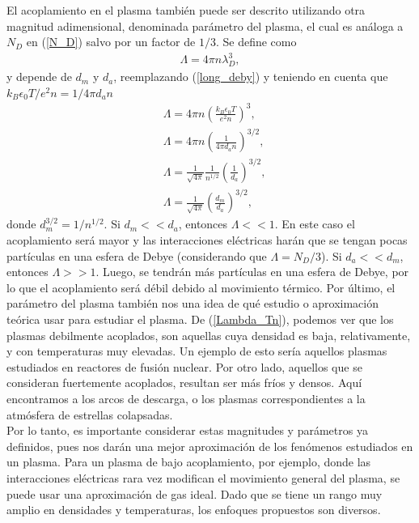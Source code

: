 \documentclass[../main.tex]{subfiles}
\begin{document}
El acoplamiento en el plasma también puede ser descrito utilizando otra magnitud adimensional, denominada parámetro del plasma, el cual es análoga a $N_D$ en (\ref{N_D}) salvo por un factor de $1/3$. Se define como
\begin{align}
    \Lambda = 4\pi n\lambda_D^3,
\end{align}
y depende de $d_m$ y $d_a$, reemplazando (\ref{long_deby}) y teniendo en cuenta que $k_B\epsilon_0T/e^2n =1/4\pi d_an$
\begin{align}
    &\Lambda = 4\pi n\left(\frac{k_B\epsilon_0T}{e^2n}\right)^3, \label{Lambda_Tn} \\
    &\Lambda = 4\pi n\left(\frac{1}{4\pi d_an}\right)^{3/2}, \\
    &\Lambda = \frac{1}{\sqrt{4\pi}}\frac{1}{n^{1/2}}\left(\frac{1}{d_a}\right)^{3/2}, \\
    &\Lambda = \frac{1}{\sqrt{4\pi}}\left(\frac{d_m}{d_a}\right)^{3/2},
\end{align}
donde $d_m^{3/2}= 1/n^{1/2}$. Si $d_m << d_a $, entonces $\Lambda << 1$. En este caso el acoplamiento será mayor y las interacciones eléctricas harán que se tengan pocas partículas en una esfera de Debye (considerando que $\Lambda = N_D/3$). Si $d_a << d_m$, entonces $\Lambda >> 1$. Luego, se tendrán más partículas en una esfera de Debye, por lo que el acoplamiento será débil debido al movimiento térmico. Por último, el parámetro del plasma también nos una idea de qué estudio o aproximación teórica usar para estudiar el plasma. De (\ref{Lambda_Tn}), podemos ver que los plasmas debilmente acoplados, son aquellas cuya densidad es baja, relativamente, y con temperaturas muy elevadas. Un ejemplo de esto sería aquellos plasmas estudiados en reactores de fusión nuclear. Por otro lado, aquellos que se consideran fuertemente acoplados, resultan ser más fríos y densos. Aquí encontramos a los arcos de descarga, o los plasmas correspondientes a la atmósfera de estrellas colapsadas. \\

Por lo tanto, es importante considerar estas magnitudes y parámetros ya definidos, pues nos darán una mejor aproximación de los fenómenos estudiados en un plasma. Para un plasma de bajo acoplamiento, por ejemplo, donde las interacciones eléctricas rara vez modifican el movimiento general del plasma, se puede usar una aproximación de gas ideal. Dado que se tiene un rango muy amplio en densidades y temperaturas, los enfoques propuestos son diversos.
    
\end{document}
